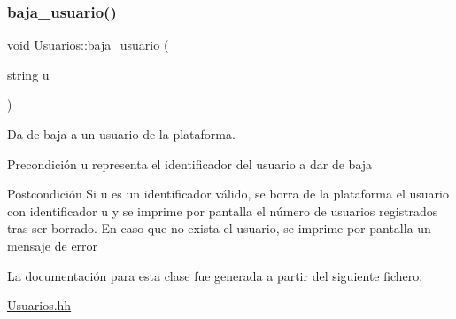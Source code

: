 \subsubsection{\texorpdfstring{baja\+\_\+usuario()}{baja\_usuario()}}
{\footnotesize\ttfamily void Usuarios\+::baja\+\_\+usuario (\begin{DoxyParamCaption}\item[{string}]{u }\end{DoxyParamCaption})}



Da de baja a un usuario de la plataforma. 

\begin{DoxyPrecond}{Precondición}
u representa el identificador del usuario a dar de baja 
\end{DoxyPrecond}
\begin{DoxyPostcond}{Postcondición}
Si u es un identificador válido, se borra de la plataforma el usuario con identificador u y se imprime por pantalla el número de usuarios registrados tras ser borrado. En caso que no exista el usuario, se imprime por pantalla un mensaje de error 
\end{DoxyPostcond}


La documentación para esta clase fue generada a partir del siguiente fichero\+:\begin{DoxyCompactItemize}
\item 
\mbox{\hyperlink{_usuarios_8hh}{Usuarios.\+hh}}\end{DoxyCompactItemize}
